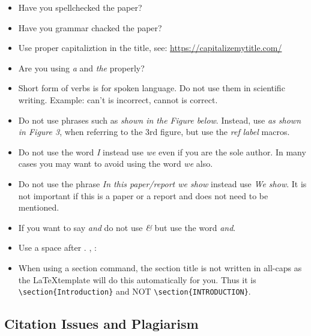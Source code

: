 \begin{itemize}[label=$\Box$]
    \item Have you spellchecked the paper?
    \item Have you grammar chacked the paper?
    \item Use proper capitaliztion in the title, see: \url{https://capitalizemytitle.com/}
     \item Are you using \textit{a} and \textit{the} properly?
    \item Short form of verbs is for spoken language. Do not use them
      in scientific writing. Example: can't is incorrect, cannot is correct.
    \item Do not use phrases such as \textit{shown in the Figure
        below}. Instead, use \textit{as shown in Figure 3}, when
      referring to the 3rd figure, but use the \textit{ref} \textit{label}
      macros.
    \item Do not use the word \textit{I} instead use \textit{we} even if you
      are the sole author. In many cases you may want to avoid using
      the word \textit{we} also.
    \item Do not use the phrase \textit{In this paper/report we show}
      instead use \textit{We show}. It is not important if this is a
      paper or a report and does not need to be mentioned. 
    \item If you want to say \textit{and} do not use \textit{\&} but use the
      word \textit{and}.
    \item Use a space after . , :
    \item When using a section command, the section title is not
      written in all-caps as the \LaTeX template will do this
      automatically for you. Thus it is \verb|\section{Introduction}|
      and NOT \verb|\section{INTRODUCTION}|.

\end{itemize}

\subsection{Citation Issues and Plagiarism}

